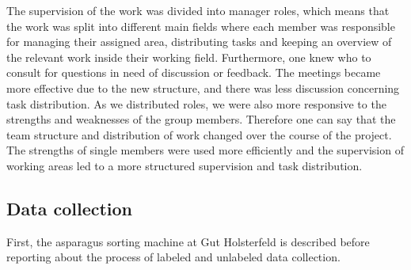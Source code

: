 The supervision of the work was divided into manager roles, which means that the work was split into different main fields where each member was responsible for managing their assigned area, distributing tasks and keeping an overview of the relevant work inside their working field. Furthermore, one knew who to consult for questions  in need of discussion or feedback. The meetings became more effective due to the new structure, and there was less discussion concerning task distribution. As we distributed roles, we were also more responsive to the strengths and weaknesses of the group members. Therefore one can say that the team structure and distribution of work changed over the course of the project. The strengths of single members were used more efficiently and the supervision of working areas led to a more structured supervision and task distribution. 


\subsection{Data collection}
\label{sec:DataCollection}

First, the asparagus sorting machine at Gut Holsterfeld is described before reporting about the process of labeled and unlabeled data collection.

